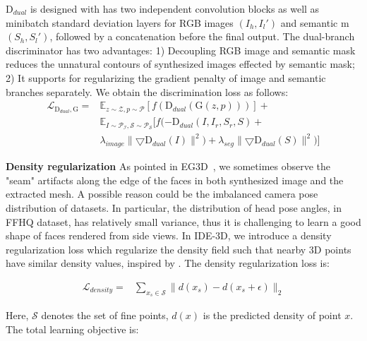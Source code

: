 \documentclass[acmtog]{acmart}
\begin{document}
$\mathrm{D}_{dual}$ is designed with has two independent convolution blocks as well as minibatch standard deviation layers for RGB images $(I_h, I_l')$ and semantic m$(S_h, S_l')$, followed by a concatenation before the final output. The dual-branch discriminator has two advantages: 1) Decoupling RGB image and semantic mask reduces the unnatural contours of synthesized images effected by semantic mask; 2) It supports for regularizing the gradient penalty of image and semantic branches separately. We obtain the discrimination loss as follows: 
\begin{equation}
    \begin{split}
    \mathcal{L}_{\mathrm{D}_{dual}, \mathrm{G}} = 
    &\mathbb{E}_{z \sim \mathcal{Z}, p \sim \mathcal{P}}[f(\mathrm{D}_{dual}(\mathrm{G}(z, p)))] + \\
    &\mathbb{E}_{I \sim \mathcal{P_{I}, S \sim \mathcal{P_{S}}}}[f(-\mathrm{D}_{dual}(I, I_r, S_r, S) + \\
    &\lambda_{image}\|\mathbf{\bigtriangledown}\mathrm{D}_{dual}(I)\|^2) + \lambda_{seg}\|\mathbf{\bigtriangledown}\mathrm{D}_{dual}(S)\|^2)]
    \end{split}
    \label{eq:generator loss}
\end{equation}

\noindent \textbf{Density regularization} As pointed in EG3D~\cite{eg3d}, we sometimes observe the "seam" artifacts along the edge of the faces in both synthesized image and the extracted mesh. A possible reason could be the imbalanced camera pose distribution of datasets. In particular, the distribution of head pose angles, in FFHQ dataset, has relatively small variance, thus it is challenging to learn a good shape of faces rendered from side views. In IDE-3D, we introduce a density regularization loss which regularize the density field such that nearby 3D points have similar density values, inspired by \cite{eg3d, oechsle2021unisurf, chen2021snarf}. The density regularization loss is:

\begin{equation}
    \begin{split}
    \mathcal{L}_{density} = 
    &\mathbf{\sum}_{x_{s} \in \mathcal{S}}\|d(x_{s}) - d(x_{s}+\epsilon)\|_2
    \end{split}
    \label{eq:generator loss}
\end{equation}

\noindent Here, $\mathcal{S}$ denotes the set of fine points, $d(x)$ is the predicted density of point $x$. The total learning objective is:
\end{document}
